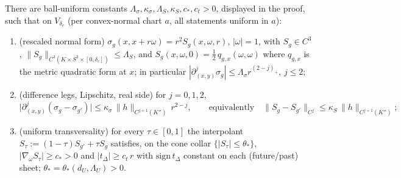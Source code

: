 \begin{lemma}\label{port:lem-sigma}
There are ball-uniform constants $\Lambda_\sigma,\kappa_\sigma,
\Lambda_S,\kappa_S,c_*,c_t>0$, displayed in the proof, such that on
$V_{\delta_c}$ (per convex-normal chart $a$, all statements uniform in
$a$):
\begin{enumerate}[label=\textup{(\roman*)},leftmargin=*,nosep]
\item (rescaled normal form) $\sigma_g(x,x+r\omega)=r^2S_g(x,\omega,r)$,
  $|\omega|=1$, with $S_g\in C^3$,
  $\|S_g\|_{C^3(K\times S^3\times[0,\delta_c])}\le\Lambda_S$, and
  $S_g(x,\omega,0)=\tfrac12\,q_{g,x}(\omega,\omega)$ where
  $q_{g,x}$ is the metric quadratic form at $x$; in particular
  $|\partial^j_{(x,y)}\sigma_g|\le\Lambda_\sigma r^{(2-j)_+}$, $j\le2$;
\item (difference legs, Lipschitz, real side) for $j=0,1,2$,
  \[
  \bigl|\partial^j_{(x,y)}(\sigma_g-\sigma_{g'})\bigr|
  \le\kappa_\sigma\,\|h\|_{C^{j+1}(K'')}\,r^{2-j},
  \qquad\text{equivalently}\quad
  \|S_g-S_{g'}\|_{C^j}\le\kappa_S\,\|h\|_{C^{j+1}(K'')};
  \]
\item (uniform transversality) for every $\tau\in[0,1]$ the interpolant
  $S_\tau:=(1-\tau)S_{g'}+\tau S_g$ satisfies, on the cone collar
  $\{|S_\tau|\le\theta_*\}$, $|\nabla_\omega S_\tau|\ge c_*>0$ and
  $|t_\Delta|\ge c_t\,r$ with $\mathrm{sign}\,t_\Delta$ constant on
  each (future/past) sheet; $\theta_*=\theta_*(d_U,\Lambda_U)>0$.
\end{enumerate}
\end{lemma}
